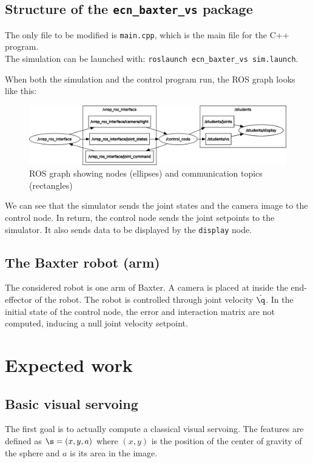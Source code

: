 \documentclass{ecnreport}
\begin{document}
\subsection{Structure of the \texttt{ecn\_baxter\_vs} package}

The only file to be modified is \texttt{main.cpp}, which is the main file for the C++ program. \\
The simulation can be launched with: \texttt{roslaunch ecn\_baxter\_vs sim.launch}.

When both the simulation and the control program run, the ROS graph looks like this:

\begin{figure}[h!]\centering
 \includegraphics[width=.6\linewidth]{rosgraph}
 \caption{ROS graph showing nodes (ellipses) and communication topics (rectangles)}
 \label{fig:rosgraph}
\end{figure}

We can see that the simulator sends the joint states and the camera image to the control node. In return, the control node sends the joint setpoints
to the simulator. It also sends data to be displayed by the \texttt{display} node.\\


\subsection{The Baxter robot (arm)}

The considered robot is one arm of Baxter. A camera is placed at inside the end-effector of the robot.
 The robot is controlled through joint velocity $\dot \q$.
 In the initial state of the control node, the error and interaction matrix are not computed, inducing a null joint velocity setpoint.
 
\section{Expected work}

\subsection{Basic visual servoing}

The first goal is to actually compute a classical visual servoing. The features are defined as $\s = (x, y, a)$ where $(x,y)$ is the position of the center of gravity of the sphere and $a$ is its area in the image.
\end{document}
